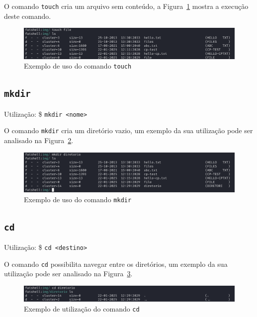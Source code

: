 \documentclass[
    12pt,				%
    oneside,   	        %
    a4paper,			%
    english,			%
    french,				%
    spanish,			%
    brazil,				%
    ]{pacotes/abntex2}
\begin{document}
O comando \texttt{touch} cria um arquivo sem conteúdo, a Figura~\ref{fig:touch} mostra a execução deste comando.

\begin{figure}[h!]
    \centering
    \includegraphics[width=450pt]{figuras/resultados/8-touch.PNG}
    \caption{Exemplo de uso do comando \texttt{touch}}
    \label{fig:touch}
\end{figure}


\subsection{\texttt{mkdir}}
\label{subsec:mkdir}
Utilização: \$ \texttt{mkdir <nome>}

O comando \texttt{mkdir} cria um diretório vazio, um exemplo da sua utilização pode ser analisado na Figura~\ref{fig:mkdir}.

\begin{figure}[H]
    \centering
    \includegraphics[width=450pt]{figuras/resultados/9-mkdir.PNG}
    \caption{Exemplo de uso do comando \texttt{mkdir}}
    \label{fig:mkdir}
\end{figure}


\subsection{\texttt{cd}}
\label{subsec:cd}
Utilização: \$ \texttt{cd <destino>}

O comando \texttt{cd} possibilita navegar entre os diretórios, um exemplo da sua utilização pode ser analisado na Figura~\ref{fig:cd}.
 
\begin{figure}[H]
    \centering
    \includegraphics[width=450pt]{figuras/resultados/10-cd.PNG}
    \caption{Exemplo de utilização do comando \texttt{cd}}
    \label{fig:cd}
\end{figure}
\end{document}
